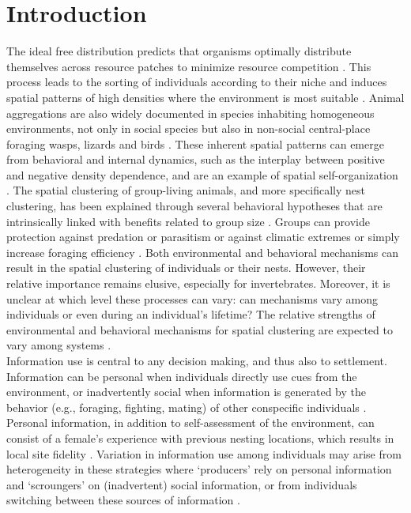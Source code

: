 \documentclass[10pt, twoside]{book} %
\begin{document}
		
\clearpage
	
	\section{Introduction}
	The ideal free distribution predicts that organisms optimally distribute themselves across resource patches to minimize resource competition \citep{kacelnik1992}. This process leads to the sorting of individuals according to their niche \citep{hutchinson1957, holt2009} and induces spatial patterns of high densities where the environment is most suitable \citep[e.g. in shorebirds;][]{swift2017}. Animal aggregations are also widely documented in species inhabiting homogeneous environments, not only in social species but also in non-social central-place foraging wasps, lizards and birds \citep{stamps1988, tarof2004, evans2007}. These inherent spatial patterns can emerge from behavioral and internal dynamics, such as the interplay between positive and negative density dependence, and are an example of spatial self-organization \citep{fortin2005, rietkerk2008, bayard2010, bradbury2014}. The spatial clustering of group-living animals, and more specifically nest clustering, has been explained through several behavioral hypotheses that are intrinsically linked with benefits related to group size \citep{krause2002}. Groups can provide protection against predation or parasitism \citep[for example via a selfish herd; Supplement S1;][]{hamilton1971, larsson1986} or against climatic extremes \citep{gilbert2008} or simply increase foraging efficiency \citep{clark1986}. Both environmental and behavioral mechanisms can result in the spatial clustering of individuals or their nests. However, their relative importance remains elusive, especially for invertebrates. Moreover, it is unclear at which level these processes can vary: can mechanisms vary among individuals or even during an individual's lifetime? The relative strengths of environmental and behavioral mechanisms for spatial clustering are expected to vary among systems \citep[for example, in analogy to bottom-up and top-down regulation of communities;][]{hunter1992}.\\
	
	Information use is central to any decision making, and thus also to settlement. Information can be personal when individuals directly use cues from the environment, or inadvertently social when information is generated by the behavior (e.g., foraging, fighting, mating) of other conspecific individuals \citep{danchin2004, dall2005}. Personal information, in addition to self-assessment of the environment, can consist of a female's experience with previous nesting locations, which results in local site fidelity \citep{hoi2012, asis2014}. Variation in information use among individuals may arise from heterogeneity in these strategies where `producers' rely on personal information and `scroungers' on (inadvertent) social information, or from individuals switching between these sources of information \citep{barnard1981, coolen2007}.\\
	
\end{document}
